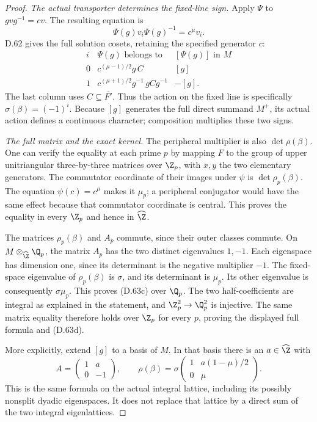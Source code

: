 \begin{proof}
\emph{The actual transporter determines the fixed-line sign.}
Apply $\Psi$ to $gvg^{-1}=cv$.
The resulting equation is
\[
             \Psi(g)v_i\Psi(g)^{-1}=c^\mu v_i.
                                                               \tag{D.63j}
\]
D.62 gives the full solution cosets, retaining the
specified generator $c$:
\[
 \begin{array}{c|c|c}
 i&\Psi(g)\text{ belongs to}&[\Psi(g)]\text{ in }M\\ \hline
 0&c^{(\mu-1)/2}g\,C&[g]\\
 1&c^{(\mu+1)/2}g^{-1}\,gCg^{-1}&-[g].
 \end{array}                                                  \tag{D.63k}
\]
The last column uses $C\subseteq\overline{F'}$.
Thus the action on the fixed line is specifically
$\sigma(\beta)=(-1)^i$.
Because $[g]$ generates the full direct summand
$M^+$, its actual action defines a continuous
character; composition multiplies these two signs.

\emph{The full matrix and the exact kernel.}
The peripheral multiplier is also
$\det\rho(\beta)$.
One can verify the equality at each prime $p$ by
mapping $F$ to the group of upper unitriangular
three-by-three matrices over $\Z_p$, with $x,y$
the two elementary generators.
The commutator coordinate of their images under
$\psi$ is $\det\rho_p(\beta)$.
The equation $\psi(c)=c^\mu$ makes it $\mu_p$;
a peripheral conjugator would have the same effect
because that commutator coordinate is central.
This proves the equality in every $\Z_p$ and hence
in $\widehat\Z$.

The matrices $\rho_p(\beta)$ and $A_p$ commute,
since their outer classes commute.
On $M\otimes_{\widehat\Z}\Q_p$, the matrix $A_p$
has the two distinct eigenvalues $1,-1$.
Each eigenspace has dimension one, since its
determinant is the negative multiplier $-1$.
The fixed-space eigenvalue of $\rho_p(\beta)$
is $\sigma$, and its determinant is $\mu_p$.
Its other eigenvalue is consequently $\sigma\mu_p$.
This proves (D.63c) over $\Q_p$.
The two half-coefficients are integral as explained
in the statement, and $\Z_p^2\to\Q_p^2$ is injective.
The same matrix equality therefore holds over
$\Z_p$ for every $p$, proving the displayed full
formula and (D.63d).

More explicitly, extend $[g]$ to a basis of $M$.
In that basis there is an $a\in\widehat\Z$ with
\[
 A=\begin{pmatrix}1&a\\0&-1\end{pmatrix},
 \qquad
 \rho(\beta)=
 \sigma\begin{pmatrix}
           1&a(1-\mu)/2\\0&\mu
         \end{pmatrix}.                                    \tag{D.63l}
\]
This is the same formula on the actual integral
lattice, including its possibly nonsplit dyadic
eigenspaces. It does not replace that lattice by
a direct sum of the two integral eigenlattices.


\end{proof}
